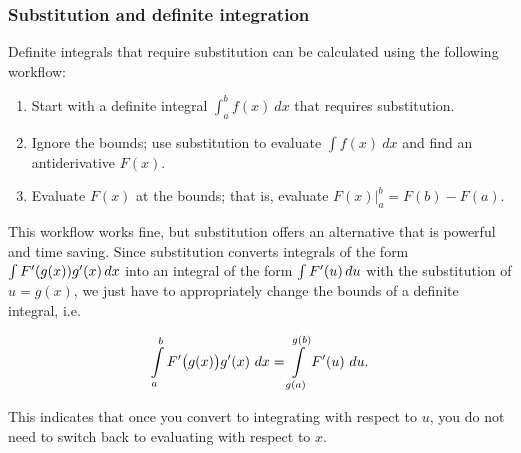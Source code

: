 \subsubsection{Substitution and definite integration}
Definite integrals that require substitution can be calculated using the following workflow:
\begin{enumerate}
\item		Start with a definite integral $ \int_a^b f(x)\ dx$ that requires substitution.
\item		Ignore the bounds; use substitution to evaluate $\int f(x)\ dx$ and find an antiderivative $F(x)$.
\item		Evaluate $F(x)$ at the bounds; that is, evaluate $F(x)\Big|_a^b = F(b) - F(a)$.
\end{enumerate}
This workflow works fine, but substitution offers an alternative that is powerful and time saving. Since substitution converts integrals of the form $\int F'(g(x))g'(x)\,dx$ into an integral of the form $\int F'(u)\,du$ with the substitution of $u = g(x)$, we just have to appropriately change the bounds of a definite integral, i.e. 

$$\ds\int\limits_a^b \Fp\big(g(x)\big)g'(x)\ dx = \ds\int\limits_{g(a)}^{g(b)} \Fp(u)\ du.$$

This indicates that once you convert to integrating with respect to $u$, you do not need to switch back to evaluating with respect to $x$. 

